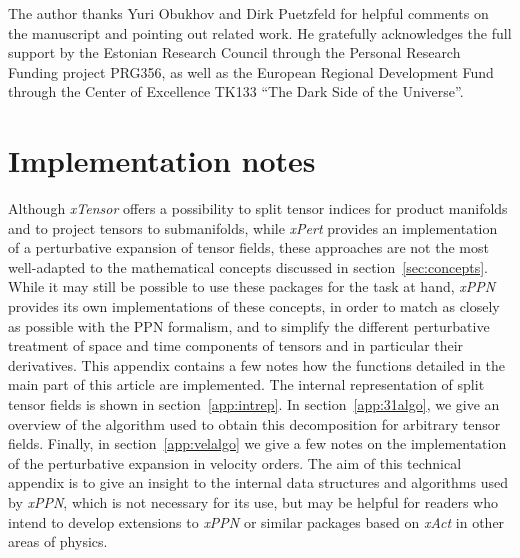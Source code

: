 \documentclass[notitlepage,a4paper,aps,prd,onecolumn,superscriptaddress,nofootinbib,groupedaddress,longbibliography]{revtex4-1}
\newcommand{\xPPN}{\emph{xPPN}}
\newcommand{\xAct}{\emph{xAct}}
\newcommand{\xTensor}{\emph{xTensor}}
\newcommand{\xPert}{\emph{xPert}}
\begin{document}
\begin{acknowledgments}
The author thanks Yuri Obukhov and Dirk Puetzfeld for helpful comments on the manuscript and pointing out related work. He gratefully acknowledges the full support by the Estonian Research Council through the Personal Research Funding project PRG356, as well as the European Regional Development Fund through the Center of Excellence TK133 ``The Dark Side of the Universe''.
\end{acknowledgments}

\appendix

\section{Implementation notes}\label{app:implementation}
Although \xTensor{} offers a possibility to split tensor indices for product manifolds and to project tensors to submanifolds, while \xPert{} provides an implementation of a perturbative expansion of tensor fields, these approaches are not the most well-adapted to the mathematical concepts discussed in section~\ref{sec:concepts}. While it may still be possible to use these packages for the task at hand, \xPPN{} provides its own implementations of these concepts, in order to match as closely as possible with the PPN formalism, and to simplify the different perturbative treatment of space and time components of tensors and in particular their derivatives. This appendix contains a few notes how the functions detailed in the main part of this article are implemented. The internal representation of split tensor fields is shown in section~\ref{app:intrep}. In section~\ref{app:31algo}, we give an overview of the algorithm used to obtain this decomposition for arbitrary tensor fields. Finally, in section~\ref{app:velalgo} we give a few notes on the implementation of the perturbative expansion in velocity orders. The aim of this technical appendix is to give an insight to the internal data structures and algorithms used by \xPPN, which is not necessary for its use, but may be helpful for readers who intend to develop extensions to \xPPN{} or similar packages based on \xAct{} in other areas of physics.
\end{document}
